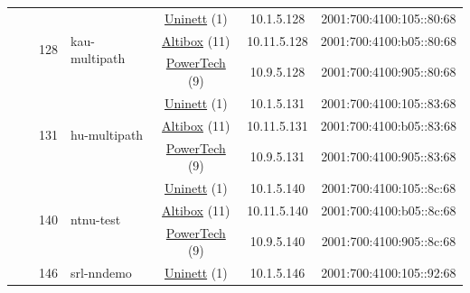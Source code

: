 \begin{small}
\begin{center}
\begin{longtable}{|c|c|c|c|c|c|c|c|}
  &  & \multirow{3}{*}{\tiny{128}} & \multicolumn{1}{|l|}{\multirow{3}{*}{\tiny{kau-multipath}}} & \multicolumn{2}{|c|}{\tiny{\href{https://www.uninett.no}{Uninett} (1)}} & \tiny{10.1.5.128} & \tiny{2001:700:4100:105::80:68} \\* \cline{5-5}\cline{6-6}\cline{7-7}\cline{8-8}
  &  &  &  & \multicolumn{2}{|c|}{\tiny{\href{https://www.altibox.no}{Altibox} (11)}} & \tiny{10.11.5.128} & \tiny{2001:700:4100:b05::80:68} \\* \cline{5-5}\cline{6-6}\cline{7-7}\cline{8-8}
  &  &  &  & \multicolumn{2}{|c|}{\tiny{\href{http://www.powertech.no}{PowerTech} (9)}} & \tiny{10.9.5.128} & \tiny{2001:700:4100:905::80:68} \\* \cline{3-3}\cline{4-4}\cline{5-5}\cline{6-6}\cline{7-7}\cline{8-8}
  &  & \multirow{3}{*}{\tiny{131}} & \multicolumn{1}{|l|}{\multirow{3}{*}{\tiny{hu-multipath}}} & \multicolumn{2}{|c|}{\tiny{\href{https://www.uninett.no}{Uninett} (1)}} & \tiny{10.1.5.131} & \tiny{2001:700:4100:105::83:68} \\* \cline{5-5}\cline{6-6}\cline{7-7}\cline{8-8}
  &  &  &  & \multicolumn{2}{|c|}{\tiny{\href{https://www.altibox.no}{Altibox} (11)}} & \tiny{10.11.5.131} & \tiny{2001:700:4100:b05::83:68} \\* \cline{5-5}\cline{6-6}\cline{7-7}\cline{8-8}
  &  &  &  & \multicolumn{2}{|c|}{\tiny{\href{http://www.powertech.no}{PowerTech} (9)}} & \tiny{10.9.5.131} & \tiny{2001:700:4100:905::83:68} \\* \cline{3-3}\cline{4-4}\cline{5-5}\cline{6-6}\cline{7-7}\cline{8-8}
  &  & \multirow{3}{*}{\tiny{140}} & \multicolumn{1}{|l|}{\multirow{3}{*}{\tiny{ntnu-test}}} & \multicolumn{2}{|c|}{\tiny{\href{https://www.uninett.no}{Uninett} (1)}} & \tiny{10.1.5.140} & \tiny{2001:700:4100:105::8c:68} \\* \cline{5-5}\cline{6-6}\cline{7-7}\cline{8-8}
  &  &  &  & \multicolumn{2}{|c|}{\tiny{\href{https://www.altibox.no}{Altibox} (11)}} & \tiny{10.11.5.140} & \tiny{2001:700:4100:b05::8c:68} \\* \cline{5-5}\cline{6-6}\cline{7-7}\cline{8-8}
  &  &  &  & \multicolumn{2}{|c|}{\tiny{\href{http://www.powertech.no}{PowerTech} (9)}} & \tiny{10.9.5.140} & \tiny{2001:700:4100:905::8c:68} \\* \cline{3-3}\cline{4-4}\cline{5-5}\cline{6-6}\cline{7-7}\cline{8-8}
  &  & \multirow{3}{*}{\tiny{146}} & \multicolumn{1}{|l|}{\multirow{3}{*}{\tiny{srl-nndemo}}} & \multicolumn{2}{|c|}{\tiny{\href{https://www.uninett.no}{Uninett} (1)}} & \tiny{10.1.5.146} & \tiny{2001:700:4100:105::92:68} \\* \cline{5-5}\cline{6-6}\cline{7-7}\cline{8-8}

\end{longtable}
\end{center}
\end{small}
